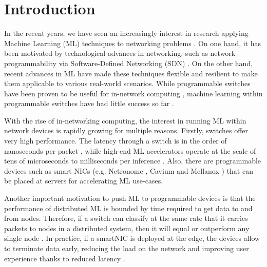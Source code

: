 \section{Introduction}




In the recent years, we have seen an increasingly interest in research applying Machine Learning (ML) techniques to networking problems \cite{boutaba2018comprehensive}. On one hand, it has been motivated by technological advances in networking, such as network programmability via Software-Defined Networking (SDN) \cite{P4}. On the other hand, recent advances in ML have made these techniques flexible and resilient to make them applicable to various real-world scenarios. While programmable switches have been proven to be useful for in-network computing \cite{In-net-computation}, machine learning within programmable switches have had little success so far \cite{xiong2019switches}. 

With the rise of in-networking computing, the interest in running ML within network devices is rapidly growing for multiple reasons. Firstly, switches offer very high performance. The latency through a switch is in the order of nanoseconds per packet \cite{Tofino}, while high-end ML accelerators operate at the scale of tens of microseconds to milliseconds per inference \cite{Tensor}. Also, there are programmable devices such as smart NICs (e.g. Netronome \cite{NETRONOME}, Cavium \cite{CAVIUM} and Mellanox \cite{MELLANOX}) that can be placed at servers for accelerating ML use-cases. 

Another important motivation to push ML to programmable devices is that the performance of distributed ML is bounded by time required to get data to and from nodes. Therefore, if a switch can classify at the same rate that it carries packets to nodes in a distributed system, then it will equal or outperform any single node \cite{xiong2019switches}. In practice, if a smartNIC is deployed at the edge, the devices allow to terminate data early, reducing the load on the network and improving user experience thanks to reduced latency \cite{PIaFFE}.  

